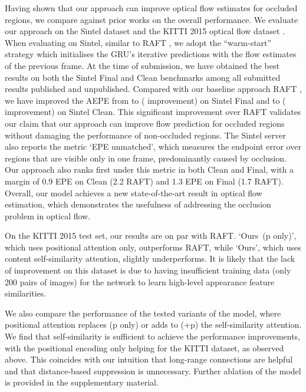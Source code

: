 \documentclass[10pt,twocolumn,letterpaper]{article}
\begin{document}
Having shown that our approach can improve optical flow estimates for occluded regions, we compare
against prior works on the overall performance. 
We evaluate our approach on the Sintel dataset \cite{sintel} and the KITTI 2015 optical flow dataset
\cite{kitti}. 
When evaluating on Sintel, similar to RAFT \cite{raft}, we adopt the ``warm-start''
strategy which initialises the GRU's iterative predictions with the flow estimates of the previous frame.
At the time of submission, we have obtained the best results on both the Sintel Final and Clean benchmarks 
among all submitted results published and unpublished. 
Compared with our baseline approach RAFT \cite{raft}, we have improved the AEPE from 
to  ( improvement) on Sintel Final and  to  ( improvement) on Sintel Clean. 
This significant improvement over RAFT validates our claim that our approach can improve 
flow prediction for occluded regions without damaging the performance of non-occluded regions. 
The Sintel server also reports the metric `EPE unmatched', which measures the endpoint error over regions
that are visible only in one frame, predominantly caused by occlusion. Our approach also ranks first
under this metric in both Clean and Final, with a margin of 0.9 EPE on Clean (2.2 \wrt RAFT) and 1.3 EPE on Final (1.7 \wrt RAFT). 
Overall, our model achieves a new state-of-the-art result in optical flow estimation, which demonstrates
the usefulness of addressing the occlusion problem in optical flow.

On the KITTI 2015 test set, our results are on par with RAFT. `Ours~(p only)', which uses positional attention
only, outperforms RAFT, while `Ours', which uses content self-similarity attention, slightly underperforms.
It is likely that the lack of improvement on this dataset is due to having insufficient
training data (only 200 pairs of images) for the network to learn high-level appearance feature similarities.

We also compare the performance of the tested variants of the model, where positional attention replaces (p only) or adds to (+p) the self-similarity attention. We find that self-similarity is sufficient to achieve the performance improvements, with the positional encoding only helping for the KITTI dataset, as observed above. This coincides with our intuition that long-range connections are helpful and that distance-based suppression is unnecessary.
Further ablation of the model is provided in the supplementary material.
\end{document}
